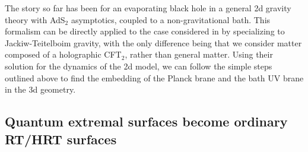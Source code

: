 \documentclass[12pt]{article}
\begin{document}
The story so far has been for an evaporating black hole in a general 2d gravity theory with AdS$_2$ asymptotics, coupled to a non-gravitational bath. 
This formalism can be directly applied to the case considered in \cite{Almheiri:2019psf} by specializing to Jackiw-Teitelboim gravity, with the only difference being that we consider matter composed of a holographic CFT$_2$, rather than general matter.
Using their solution for the dynamics of the 2d model, we can follow the simple steps outlined above to find the embedding of the Planck brane and the bath UV brane in the 3d geometry.  

\subsection{Quantum extremal surfaces become ordinary RT/HRT surfaces}
\end{document}
